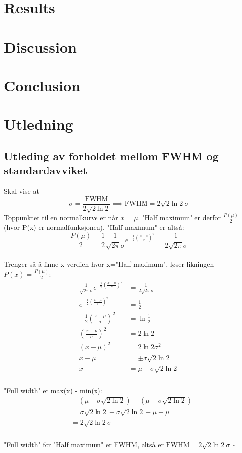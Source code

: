 \documentclass[reprint,english,notitlepage]{revtex4-1}
\begin{document}
\section{Results}
\section{Discussion}
\section{Conclusion}

\appendix
\section{Utledning}
	\subsection{Utleding av forholdet mellom FWHM og standardavviket}\label{FWHM}
	Skal vise at
	$$\sigma = \frac{\text{FWHM}}{2\sqrt{2\ln{2}}} \implies \text{FWHM} = 2\sqrt{2\ln{2}}\sigma$$
	Toppunktet til en normalkurve er når $x=\mu$. "Half maximum" er derfor $\frac{P(\mu)}{2}$
	(hvor P(x) er normalfunksjonen). "Half maximum" er altså:
	$$
	\frac{P(\mu)}{2} = \frac{1}{2}\frac{1}{\sqrt{2\pi}\sigma}e^{-\frac{1}{2}\left(\frac{\mu - \mu}{\sigma}\right)^2}
	= \frac{1}{2\sqrt{2\pi}\sigma}
	$$
	\\
	Trenger så å finne x-verdien hvor x="Half maximum", løser likningen $P(x) = \frac{P(\mu)}{2}$:
	\begin{align*}
		\frac{1}{\sqrt{2\pi}\sigma}e^{-\frac{1}{2}\left(\frac{x-\mu}{\sigma}\right)^2} &= \frac{1}{2\sqrt{2\pi}\sigma} \\
		e^{-\frac{1}{2}\left(\frac{x-\mu}{\sigma}\right)^2} &= \frac{1}{2} \\
		-\frac{1}{2}\left(\frac{x-\mu}{\sigma}\right)^2 &= \ln{\frac{1}{2}} \\
		\left(\frac{x-\mu}{\sigma}\right)^2 &= 2\ln{2} \\
		\left(x - \mu\right)^2 &= 2\ln{2}\sigma^2 \\
		x - \mu &= \pm\sigma\sqrt{2\ln{2}} \\
		x &= \underline{\mu \pm \sigma\sqrt{2\ln{2}}} \\
	\end{align*}

	"Full width" er max(x) - min(x):
	\begin{align*}
		&\ \ \ \ \ \left(\mu + \sigma\sqrt{2\ln{2}}\right) - \left(\mu - \sigma\sqrt{2\ln{2}}\right) \\
		&= \sigma\sqrt{2\ln{2}} + \sigma\sqrt{2\ln{2}} + \mu - \mu \\
		&= \underline{2\sqrt{2\ln{2}}\sigma}
	\end{align*}
	\\
	"Full width" for "Half maximum" er FWHM, altså er $\text{FWHM} = 2\sqrt{2\ln{2}}\sigma \ \ \square$
\end{document}
